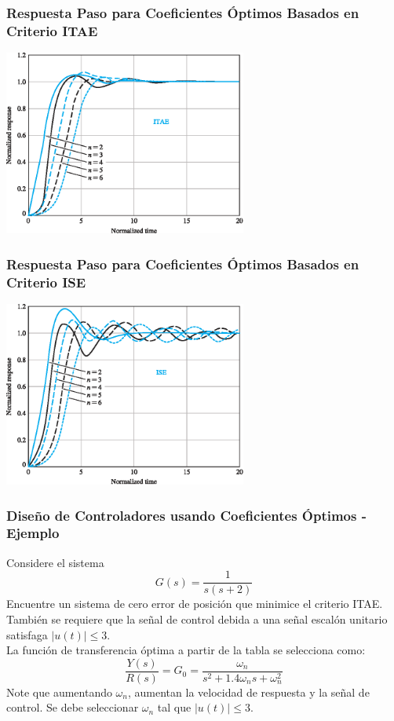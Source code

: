\documentclass[aspectratio=169]{beamer}
\theoremstyle{definition}
\theoremstyle{plain}
\theoremstyle{remark}
\begin{document}
\begin{frame}[c]\frametitle{Respuesta Paso para Coeficientes Óptimos Basados en Criterio ITAE}
\vspace*{5mm}
\centering
\includegraphics[width=8cm]{images/stepResponseOptimITAE.eps}
\end{frame}

\begin{frame}[c]\frametitle{Respuesta Paso para Coeficientes Óptimos Basados en Criterio ISE}
\vspace*{5mm}
\centering
\includegraphics[width=8cm]{images/stepResponseOptimISE.eps}
\end{frame}

\begin{frame}[<+->]\frametitle{Diseño de Controladores usando Coeficientes Óptimos - Ejemplo}
Considere el sistema
\begin{equation*}
	G(s) = \frac{1}{s(s+2)}
\end{equation*}
Encuentre un sistema de cero error de posición que minimice el criterio ITAE. También se requiere que la señal de control debida a una señal escalón unitario satisfaga $|u(t)| \leq 3$.\\
\vspace*{3mm}
La función de transferencia óptima a partir de la tabla se selecciona como:
\begin{equation*}
	\frac{Y(s)}{R(s)} = G_0 = \frac{\omega_n}{s^2 + 1.4 \omega_n s + \omega_n^2}
\end{equation*}
Note que aumentando $\omega_n$, aumentan la velocidad de respuesta y la señal de control. Se debe seleccionar $\omega_n$ tal que $|u(t)| \leq 3$.
\end{frame}
\end{document}

